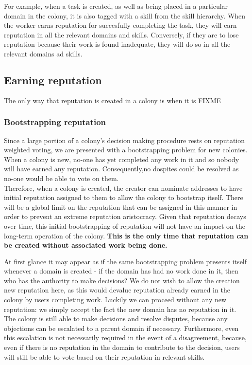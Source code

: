 For example, when a task is created, as well as being placed in a particular domain in the colony, it is also tagged with a skill from the skill hierarchy. When the worker earns reputation for succesfully completing the task, they will earn reputation in all the relevant domains and skills. Conversely, if they are to lose reputation because their work is found inadequate, they will do so in all the relevant domains ad skills.

\subsection{Earning reputation}
The only way that reputation is created in a colony is when it is FIXME

\subsubsection{Bootstrapping reputation}

Since a large portion of a colony's decision making procedure rests on reputation weighted voting, we are presented with a bootstrapping problem for new colonies.
When a colony is new, no-one has yet completed any work in it and so nobody will have earned any reputation. Consequently,no dospites could be resolved as no-one would be able to vote on them. \\
Therefore, when a colony is created, the creator can nominate addresses to have initial reputation assigned to them to allow the colony to bootstrap itself. There will be a global limit on the reputation that can be assigned in this manner in order to prevent an extreme reputation aristocracy. Given that reputation decays over time, this initial bootstrapping of reputation will not have an impact on the long-term operation of the colony. \textbf{This is the only time that reputation can be created without associated work being done.}

At first glance it may appear as if the same bootstrapping problem presents itself whenever a domain is created - if the domain has had no work done in it, then who has the authority to make decisions? We do not wish to allow the creation new reputation here, as this would devalue reputation already earned in the colony by users completing work. Luckily we can proceed without any new reputation: we simply accept the fact the new domain has no reputation in it. The colony is still able to make decisions and resolve disputes, because any objections can be escalated to a parent domain if necessary. Furthermore, even this escalation is not necessarily required in the event of a disagreement, because, even if there is no reputation in the domain to contribute to the decision, users will still be able to vote based on their reputation in relevant skills.

